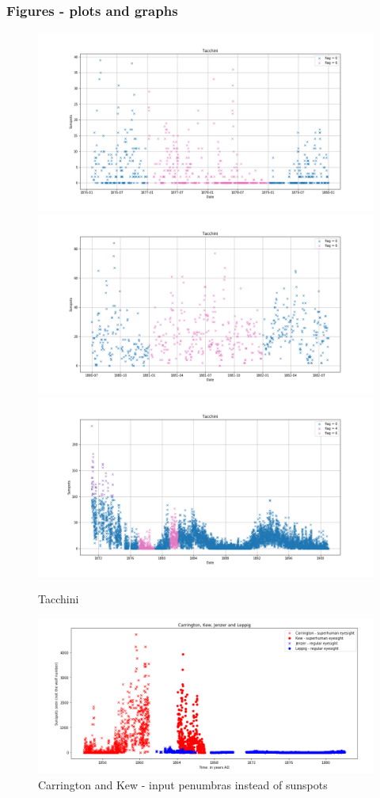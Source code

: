 \documentclass[12pt]{article}
\begin{document}
\newpage{}

\subsubsection{Figures - plots and graphs}

\begin{figure}[H]
    \includegraphics[width=0.5\linewidth]{tacchini1877_patch.png}
    \includegraphics[width=0.5\linewidth]{tacchini1881_patch.png}
    \includegraphics[width=\linewidth]{tacchini_pached.png}
    \caption{Tacchini}
    \label{fig:tacchini}
\end{figure}

\begin{figure}[H]
  \includegraphics[width=\linewidth]{CarringtonHasGoodEyesight.png}
  \caption{Carrington and Kew - input penumbras instead of sunspots}
  \label{fig:carrington-kew-penumbras}
\end{figure}
\end{document}
